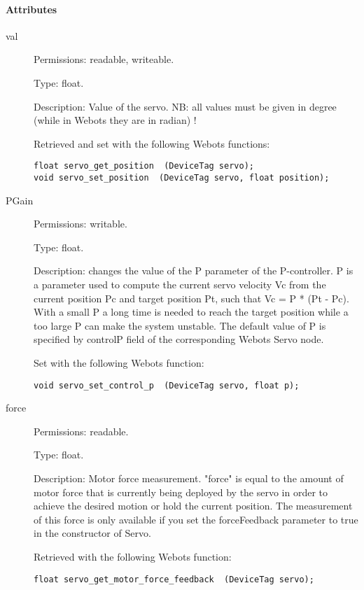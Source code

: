 \paragraph{Attributes}
\label{webots.uobjects.robotdevices.servo.attributes}%

\noindent
\begin{description}
\item[{         val
 }]            Permissions: readable, writeable.


 Type: float.


 Description: Value of the servo. NB: all values must be given in
 degree (while in Webots they are in radian) !


          Retrieved and set with the following Webots functions:


\begin{lstlisting}
float servo_get_position  (DeviceTag servo);
void servo_set_position  (DeviceTag servo, float position);
\end{lstlisting}
\item[{         PGain
 }]            Permissions: writable.


 Type: float.


 Description: changes the value of the P parameter of the
 P-{}controller. P is a parameter used to compute the current servo
 velocity Vc from the current position Pc and target position Pt, such
 that Vc = P * (Pt -{} Pc).  With a small P a long time is needed to
 reach the target position while a too large P can make the system
 unstable.  The default value of P is specified by controlP field of
 the corresponding Webots Servo node.


          Set with the following Webots function:


\begin{lstlisting}
void servo_set_control_p  (DeviceTag servo, float p);
\end{lstlisting}
\item[{         force
 }]            Permissions: readable.


 Type: float.


 Description: Motor force measurement. "force" is equal to the amount
 of motor force that is currently being deployed by the servo in order
 to achieve the desired motion or hold the current position.  The
 measurement of this force is only available if you set the
 forceFeedback parameter to true in the constructor of Servo.


          Retrieved with the following Webots function:


\begin{lstlisting}
float servo_get_motor_force_feedback  (DeviceTag servo);
\end{lstlisting}
\end{description}

